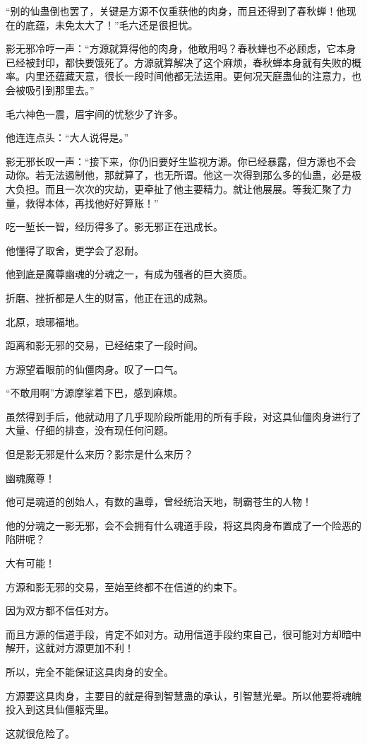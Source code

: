 \begin{this_body}
“别的仙蛊倒也罢了，关键是方源不仅重获他的肉身，而且还得到了春秋蝉！他现在的底蕴，未免太大了！”毛六还是很担忧。

影无邪冷哼一声：“方源就算得他的肉身，他敢用吗？春秋蝉也不必顾虑，它本身已经被封印，都快要饿死了。方源就算解决了这个麻烦，春秋蝉本身就有失败的概率。内里还蕴藏天意，很长一段时间他都无法运用。更何况天庭蛊仙的注意力，也会被吸引到那里去。”

毛六神色一震，眉宇间的忧愁少了许多。

他连连点头：“大人说得是。”

影无邪长叹一声：“接下来，你仍旧要好生监视方源。你已经暴露，但方源也不会动你。若无法遏制他，那就算了，也无所谓。他这一次得到那么多的仙蛊，必是极大负担。而且一次次的灾劫，更牵扯了他主要精力。就让他展展。等我汇聚了力量，救得本体，再找他好好算账！”

吃一堑长一智，经历得多了。影无邪正在迅成长。

他懂得了取舍，更学会了忍耐。

他到底是魔尊幽魂的分魂之一，有成为强者的巨大资质。

折磨、挫折都是人生的财富，他正在迅的成熟。

北原，琅琊福地。

距离和影无邪的交易，已经结束了一段时间。

方源望着眼前的仙僵肉身。叹了一口气。

“不敢用啊”方源摩挲着下巴，感到麻烦。

虽然得到手后，他就动用了几乎现阶段所能用的所有手段，对这具仙僵肉身进行了大量、仔细的排查，没有现任何问题。

但是影无邪是什么来历？影宗是什么来历？

幽魂魔尊！

他可是魂道的创始人，有数的蛊尊，曾经统治天地，制霸苍生的人物！

他的分魂之一影无邪，会不会拥有什么魂道手段，将这具肉身布置成了一个险恶的陷阱呢？

大有可能！

方源和影无邪的交易，至始至终都不在信道的约束下。

因为双方都不信任对方。

而且方源的信道手段，肯定不如对方。动用信道手段约束自己，很可能对方却暗中解开，这就对方源更加不利！

所以，完全不能保证这具肉身的安全。

方源要这具肉身，主要目的就是得到智慧蛊的承认，引智慧光晕。所以他要将魂魄投入到这具仙僵躯壳里。

这就很危险了。


\end{this_body}
